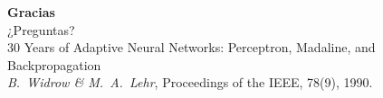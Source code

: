 \documentclass[aspectratio=169, 11pt, xcolor={dvipsnames,table}]{beamer}
\newcommand{\azul}[1]{\textcolor{UsachAzul}{#1}}
\begin{document}
\begin{frame}[plain]
\vfill
\begin{center}
{\Huge\bfseries\azul{Gracias}}\\[10pt]
{\large ¿Preguntas?}\\[18pt]
\footnotesize
30 Years of Adaptive Neural Networks: Perceptron, Madaline, and Backpropagation\\
\emph{B.\ Widrow \& M.\ A.\ Lehr}, Proceedings of the IEEE, 78(9), 1990.
\end{center}
\vfill
\end{frame}
\end{document}
